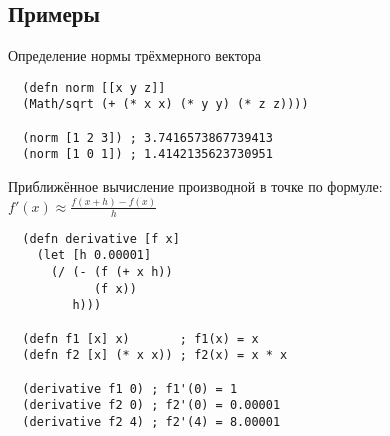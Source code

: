 \subsection{Примеры}

Определение нормы трёхмерного вектора

\begin{verbatim}
  (defn norm [[x y z]]
  (Math/sqrt (+ (* x x) (* y y) (* z z))))

  (norm [1 2 3]) ; 3.7416573867739413
  (norm [1 0 1]) ; 1.4142135623730951
\end{verbatim}

Приближённое вычисление производной в точке по формуле: \( f'(x) \approx \frac{f(x+h) - f(x)}{h}\)

\begin{verbatim}
  (defn derivative [f x]
    (let [h 0.00001]
      (/ (- (f (+ x h))
            (f x))
         h)))

  (defn f1 [x] x)       ; f1(x) = x
  (defn f2 [x] (* x x)) ; f2(x) = x * x

  (derivative f1 0) ; f1'(0) = 1
  (derivative f2 0) ; f2'(0) = 0.00001
  (derivative f2 4) ; f2'(4) = 8.00001
\end{verbatim}


